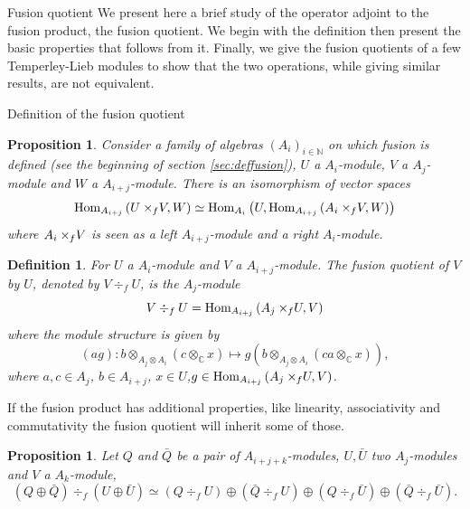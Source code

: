 \documentclass[reqno]{amsart}
\newtheorem{Prop}[Thm]{Proposition}
\newtheorem{Def}{Definition}
\newcommand{\xf}{\times\hspace{-0.27em}_f}
\begin{document}
\begin{section}{Fusion quotient}\label{sec:fusion_quotient}
We present here a brief study of the operator adjoint to the fusion product, the fusion quotient. We begin with the definition then present the basic properties that follows from it. Finally, we give the fusion quotients of a few Temperley-Lieb modules to show that the two operations, while giving similar results, are not equivalent.
\begin{subsection}{Definition of the fusion quotient}
\begin{Prop}\label{f_frob}
Consider a family of algebras $(A_i)_{i \in \mathbb{N}}$ on which fusion is defined (see the beginning of section \ref{sec:deffusion}), $U$ a $A_i$-module, $V$ a $A_{j}$-module and $W$ a $A_{i+j}$-module. There is an isomorphism of vector spaces
\begin{equation}
\text{\rm Hom}_{A_{i+j}}\left(U \xf V, W\right) \simeq \text{\rm Hom}_{A_{i}}\left(U,\text{Hom}_{A_{i+j}}\left( A_{i}\xf V, W\right)\right)
\end{equation}
where $A_{i}\xf V$ is seen as a left $A_{i+j}$-module and a right $A_{i}$-module.
\end{Prop}
\begin{Def}
For $U$ a $A_{i}$-module and $V$ a $A_{i+j}$-module. The \emph{fusion quotient} of $V$ by $U$, denoted by $V \div_{f} U$, is the $A_{j}$-module
\begin{equation}
V \div_{f} U = \text{\rm Hom}_{A_{i+j}}\left(A_{j}\xf U, V\right)
\end{equation}
where the module structure is given by
\begin{equation}
(a g): b \otimes_{A_{j}\otimes A_{i}}\left(c \otimes_{\mathbb{C}} x\right) \mapsto g\left(b \otimes_{A_{j}\otimes A_{i}}\left(c a\otimes_{\mathbb{C}} x\right) \right),
\end{equation}
where $a,c \in A_{j}$, $b \in A_{i+j}$, $x \in U$,$g \in \text{Hom}_{A_{i+j}}\left(A_{j} \xf U,V \right)$.
\end{Def}
If the fusion product has additional properties, like linearity, associativity and commutativity the fusion quotient will inherit some of those.
\begin{Prop}\label{prop:fusionq.prop}
Let $Q$ and $\bar{Q}$ be a pair of $A_{i+j+k}$-modules, $U, \bar{U}$ two $A_{j}$-modules and $V$ a $A_{k}$-module,
\begin{equation}\label{fq_linear}
\left(Q \oplus \bar{Q} \right)\div_{f} \left(U \oplus \bar{U}\right) \simeq \left(Q \div_{f} U \right) \oplus \left(\bar{Q} \div_{f} U \right) \oplus\left(Q \div_{f} \bar{U} \right) \oplus\left(\bar{Q} \div_{f} \bar{U} \right).

\end{equation}
\end{Prop}
\end{subsection}
\end{section}
\end{document}
